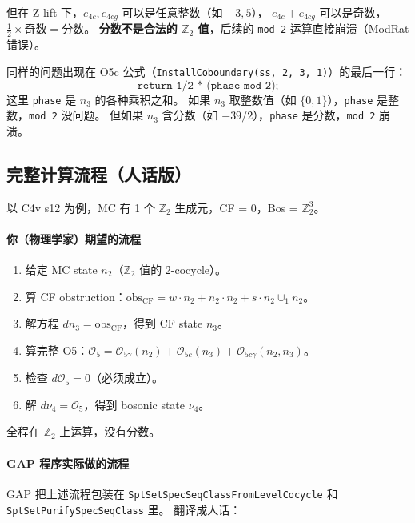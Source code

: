 \documentclass[a4paper,fontset=ubuntu,12pt]{ctexart}
\begin{document}
但在 Z-lift 下，$e_{4c}, e_{4cg}$ 可以是任意整数（如 $-3, 5$），
$e_{4c} + e_{4cg}$ 可以是奇数，$\frac{1}{2} \times \text{奇数} = \text{分数}$。
\textbf{分数不是合法的 $\mathbb{Z}_2$ 值}，后续的 \texttt{mod 2} 运算直接崩溃（ModRat 错误）。

同样的问题出现在 O5c 公式（\texttt{InstallCoboundary(ss, 2, 3, 1)}）的最后一行：
\begin{equation}
\texttt{return 1/2 * (phase mod 2);}
\end{equation}
这里 \texttt{phase} 是 $n_3$ 的各种乘积之和。
如果 $n_3$ 取整数值（如 $\{0, 1\}$），\texttt{phase} 是整数，\texttt{mod 2} 没问题。
但如果 $n_3$ 含分数（如 $-39/2$），\texttt{phase} 是分数，\texttt{mod 2} 崩溃。

\subsection{完整计算流程（人话版）}
\label{sec:full-flow-human}

以 C4v s12 为例，MC 有 1 个 $\mathbb{Z}_2$ 生成元，CF = 0，Bos = $\mathbb{Z}_2^3$。

\paragraph{你（物理学家）期望的流程}
\begin{enumerate}
\item 给定 MC state $n_2$（$\mathbb{Z}_2$ 值的 2-cocycle）。
\item 算 CF obstruction：$\text{obs}_{\mathrm{CF}} = w \cdot n_2 + n_2 \cdot n_2 + s \cdot n_2 \cup_1 n_2$。
\item 解方程 $dn_3 = \text{obs}_{\mathrm{CF}}$，得到 CF state $n_3$。
\item 算完整 O5：$\mathcal{O}_5 = \mathcal{O}_{5\gamma}(n_2) + \mathcal{O}_{5c}(n_3) + \mathcal{O}_{5c\gamma}(n_2, n_3)$。
\item 检查 $d\mathcal{O}_5 = 0$（必须成立）。
\item 解 $d\nu_4 = \mathcal{O}_5$，得到 bosonic state $\nu_4$。
\end{enumerate}
全程在 $\mathbb{Z}_2$ 上运算，没有分数。

\paragraph{GAP 程序实际做的流程}

GAP 把上述流程包装在 \texttt{SptSetSpecSeqClassFromLevelCocycle} 和 \texttt{SptSetPurifySpecSeqClass} 里。
翻译成人话：
\end{document}
